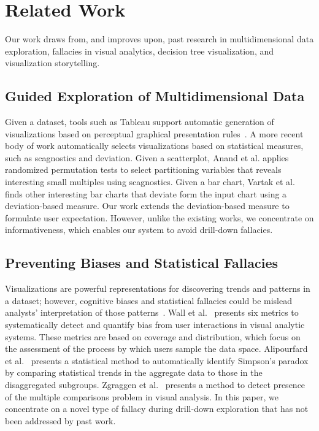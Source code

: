 \section{Related Work}

Our work draws from, and improves upon, past research in multidimensional data exploration, fallacies in visual analytics, decision tree visualization, and visualization storytelling.

\subsection{Guided Exploration of Multidimensional Data}
Given a dataset, tools such as Tableau support automatic generation of visualizations based on perceptual graphical presentation rules~\cite{Mackinlay2007,Wongsuphasawat2016}. A more recent body of work automatically selects visualizations based on statistical measures, such as scagnostics and deviation. Given a scatterplot, Anand et al. \cite{Anand2015} applies randomized permutation tests to select partitioning variables that reveals interesting small multiples using scagnostics. Given a bar chart, Vartak et al. \cite{Vartak2015} finds other interesting bar charts that deviate form the input chart using a deviation-based measure. Our work extends the deviation-based measure to formulate user expectation. However, unlike the existing works, we concentrate on informativeness, which enables our system to avoid drill-down fallacies.

\subsection{Preventing Biases and Statistical Fallacies}
Visualizations are powerful representations for discovering trends and patterns in a dataset; however, cognitive biases and statistical fallacies could be mislead analysts' interpretation of those patterns~\cite{Wall2017, Alipourfard2018WSDM, Zgraggen2018CHI}. Wall et al.~\cite{Wall2017} presents six metrics to systematically detect and quantify bias from user interactions in visual analytic systems. These metrics are based on coverage and distribution, which focus on the assessment of the process by which users sample the data space. Alipourfard et al.~\cite{Alipourfard2018WSDM} presents a statistical method to automatically identify Simpson's paradox by comparing statistical trends in the aggregate data to those in the disaggregated subgroups. Zgraggen et al.~\cite{Zgraggen2018CHI} presents a method to detect presence of the multiple comparisons problem in visual analysis. In this paper, we concentrate on a novel type of fallacy during drill-down exploration that has not been addressed by past work. %

